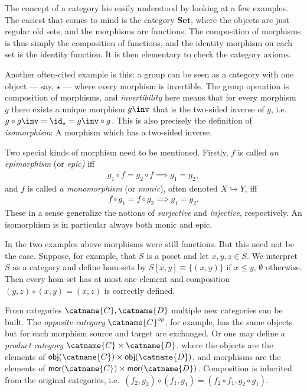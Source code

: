 \bigno
The concept of a category his easily understood by looking at a few examples. The easiest that comes to mind is the category $\mathbf{Set}$, where the objects are just regular old sets, and the morphisms are functions. The composition of morphisms is thus simply the composition of functions, and the identity morphism on each set is the identity function.  It is then elementary to check the category axioms.

Another often-cited example is this: a group can be seen as a category with one object --- say, $\star$ ---  where every morphism is invertible. The group operation is composition of morphisms, and \emph{invertibility} here means that for every morphism $g$ there exists a unique morphism $g\inv$ that is the two-sided inverse of $g$, i.e.\ $g\circ g\inv = \id_\star = g\inv\circ g$. This is also precisely the definition of \emph{isomorphism}: A morphism which has a two-sided inverse.

Two special kinds of morphism need to be mentioned.  Firstly, $f$ is called \emph{an epimorphism} (or \emph{epic)} iff
\begin{align*}
g_1 \circ f = g_2 \circ f \implies g_1 = g_2,
\end{align*}
and $f$ is called \emph{a monomorphism} (or \emph{monic}), often denoted $X\hookrightarrow Y$, iff
\begin{align*}
f\circ g_1 = f\circ g_2 \implies g_1 = g_2.
\end{align*}
These in a sense generalize the notions of \emph{surjective} and \emph{injective}, respectively. An isomorphism is in particular always both monic and epic.

\bigno
In the two examples above morphisms were still functions. But this need not be the case. Suppose, for example, that $S$ is a poset and let $x,y,z\in S$. We interpret $S$ as a category and define hom-sets by $S[x,y]\equiv\{(x,y) \}$ if $x \leq y$, $\emptyset$ otherwise. Then every hom-set has at most one element and composition $(y,z)\circ(x,y) = (x,z)$ is correctly defined.

From categories $\catname{C}, \catname{D}$ multiple new categories can be built. The \emph{opposite category} $\catname{C}^{op}$, for example, has the same objects but for each morphism source and target are exchanged. Or one may define a \emph{product category} $\catname{C}\times\catname{D}$, where the objects are the elements of $\mathsf{obj}(\catname{C})\times\mathsf{obj}(\catname{D})$, and morphisms are the elements of $\mathsf{mor}(\catname{C})\times\mathsf{mor}(\catname{D})$. Composition is inherited from the original categories, i.e.\ $(f_2,g_2)\circ(f_1,g_1) = (f_2\circ f_1, g_2\circ g_1)$.

